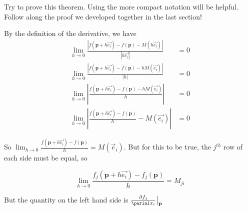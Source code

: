 \documentclass{ximera}
\begin{document}
	Try to prove this theorem.  Using the more compact notation will be helpful.  Follow along the proof we developed together in the last section!
	\begin{free-response}
		By the definition of the derivative,  we have 
		\begin{align*}
		 \lim_{h \to 0} \frac{\left| f(\mathbf{p}+h\vec{e_i}) - f(\mathbf{p}) - M(h\vec{e_i}) \right|}{\left| h\vec{e_i}\right|} &= 0\\
		 \lim_{h \to 0} \frac{\left| f(\mathbf{p}+h\vec{e_i}) - f(\mathbf{p}) - hM(\vec{e_i}) \right|}{|h|} &= 0\\
		 \lim_{h \to 0} \left| \frac{f(\mathbf{p}+h\vec{e_i}) - f(\mathbf{p}) - hM(\vec{e_i})}{h} \right|&= 0\\
		  \lim_{h \to 0} \left| \frac{f(\mathbf{p}+h\vec{e_i}) - f(\mathbf{p})}{h} - M(\vec{e_i}) \right|&= 0
		 \end{align*}
		 
		 So $\lim_{h \to 0}  \frac{f(\mathbf{p}+h\vec{e_i}) - f(\mathbf{p})}{h}  = M (\vec{e}_i)$.  But for this to be true, the $j^{th}$ row of each side must be equal, so 
		 
		\[\lim_{h \to 0}  \frac{f_j(\mathbf{p}+h\vec{e_i}) - f_j(\mathbf{p})}{h}  = M _{ji}\]
		
		But the quantity on the left hand side is $\frac{\partial f_j}{\parial x_i}\big|_{\mathbf{p}}$
	\end{free-response}
\end{document}
